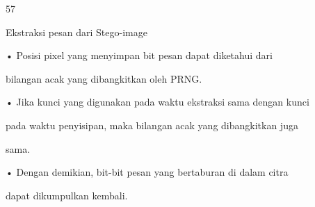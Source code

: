 \documentclass{article}
\begin{document}

57

Ekstraksi pesan dari Stego-image

• Posisi pixel yang menyimpan bit pesan dapat diketahui dari 

bilangan acak yang dibangkitkan oleh PRNG. 

• Jika kunci yang digunakan pada waktu ekstraksi sama dengan kunci 

pada waktu penyisipan, maka bilangan acak yang dibangkitkan juga 

sama. 

• Dengan demikian, bit-bit pesan yang bertaburan di dalam citra 

dapat dikumpulkan kembali.
\end{document}
